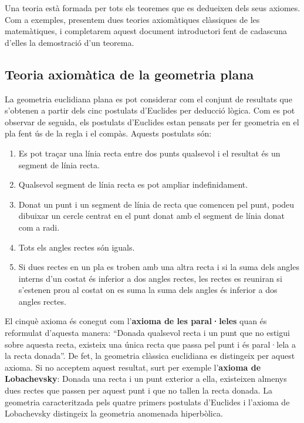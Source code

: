 \bigskip

Una teoria està formada per tots els teoremes que es dedueixen dels seus
axiomes. Com a exemples, presentem dues teories axiomàtiques clàssiques de les matemàtiques, i completarem aquest document introductori
fent de cadascuna d'elles la demostració d'un teorema.

\subsection{Teoria axiomàtica de la geometria plana}

La geometria euclidiana plana es pot considerar com el conjunt de resultats
que s'obtenen a partir dels cinc postulats d'Euclides per deducció lògica. Com es pot observar de seguida, els postulats d'Euclides estan pensats
per fer geometria en el pla fent ús de la regla i el compàs. Aquests
postulats són:

\begin{enumerate}
\item Es pot traçar una línia recta entre dos punts qualsevol i el
resultat és un segment de línia recta.

\item Qualsevol segment de línia recta es pot ampliar indefinidament.

\item Donat un punt i un segment de línia de recta que comencen pel
punt, podeu dibuixar un cercle centrat en el punt donat amb el segment de línia donat com a radi.

\item Tots els angles rectes són iguals.

\item Si dues rectes en un pla es troben amb una altra recta i si la suma
dels angles interns d'un costat és inferior a dos angles rectes, les
rectes es reuniran si s'estenen prou al costat on es suma la suma dels
angles és inferior a dos angles rectes.

\end{enumerate}

El cinquè axioma és conegut com l'\textbf{axioma de les
paral·leles} quan és reformulat d'aquesta manera:
\enquote{Donada qualsevol recta i un punt que no estigui sobre aquesta recta,
existeix una única recta que passa pel punt i és
paral·lela a la recta donada}. De fet, la geometria clàssica euclidiana es distingeix per aquest axioma. Si no acceptem aquest
resultat, surt per exemple l'\textbf{axioma de Lobachevsky}: Donada una
recta i un punt exterior a ella, existeixen almenys dues rectes que passen
per aquest punt i que no tallen la recta donada. La geometria caracteritzada
pels quatre primers postulats d'Euclides i l'axioma de Lobachevsky
distingeix la geometria anomenada hiperbòlica.

